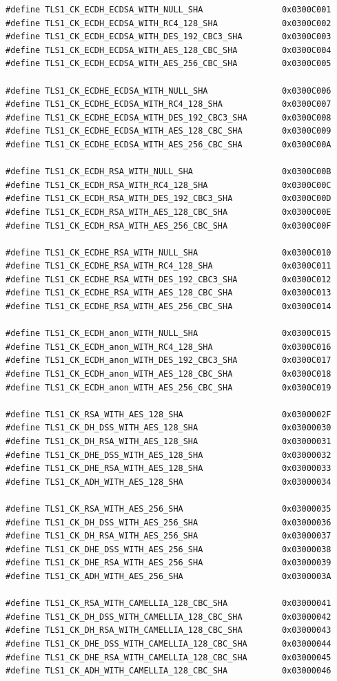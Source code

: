 \documentclass[a4paper,11pt,french]{article}
\begin{document}
\begin{verbatim}
#define TLS1_CK_ECDH_ECDSA_WITH_NULL_SHA                0x0300C001
#define TLS1_CK_ECDH_ECDSA_WITH_RC4_128_SHA             0x0300C002
#define TLS1_CK_ECDH_ECDSA_WITH_DES_192_CBC3_SHA        0x0300C003
#define TLS1_CK_ECDH_ECDSA_WITH_AES_128_CBC_SHA         0x0300C004
#define TLS1_CK_ECDH_ECDSA_WITH_AES_256_CBC_SHA         0x0300C005

#define TLS1_CK_ECDHE_ECDSA_WITH_NULL_SHA               0x0300C006
#define TLS1_CK_ECDHE_ECDSA_WITH_RC4_128_SHA            0x0300C007
#define TLS1_CK_ECDHE_ECDSA_WITH_DES_192_CBC3_SHA       0x0300C008
#define TLS1_CK_ECDHE_ECDSA_WITH_AES_128_CBC_SHA        0x0300C009
#define TLS1_CK_ECDHE_ECDSA_WITH_AES_256_CBC_SHA        0x0300C00A

#define TLS1_CK_ECDH_RSA_WITH_NULL_SHA                  0x0300C00B
#define TLS1_CK_ECDH_RSA_WITH_RC4_128_SHA               0x0300C00C
#define TLS1_CK_ECDH_RSA_WITH_DES_192_CBC3_SHA          0x0300C00D
#define TLS1_CK_ECDH_RSA_WITH_AES_128_CBC_SHA           0x0300C00E
#define TLS1_CK_ECDH_RSA_WITH_AES_256_CBC_SHA           0x0300C00F

#define TLS1_CK_ECDHE_RSA_WITH_NULL_SHA                 0x0300C010
#define TLS1_CK_ECDHE_RSA_WITH_RC4_128_SHA              0x0300C011
#define TLS1_CK_ECDHE_RSA_WITH_DES_192_CBC3_SHA         0x0300C012
#define TLS1_CK_ECDHE_RSA_WITH_AES_128_CBC_SHA          0x0300C013
#define TLS1_CK_ECDHE_RSA_WITH_AES_256_CBC_SHA          0x0300C014

#define TLS1_CK_ECDH_anon_WITH_NULL_SHA                 0x0300C015
#define TLS1_CK_ECDH_anon_WITH_RC4_128_SHA              0x0300C016
#define TLS1_CK_ECDH_anon_WITH_DES_192_CBC3_SHA         0x0300C017
#define TLS1_CK_ECDH_anon_WITH_AES_128_CBC_SHA          0x0300C018
#define TLS1_CK_ECDH_anon_WITH_AES_256_CBC_SHA          0x0300C019

#define TLS1_CK_RSA_WITH_AES_128_SHA                    0x0300002F
#define TLS1_CK_DH_DSS_WITH_AES_128_SHA                 0x03000030
#define TLS1_CK_DH_RSA_WITH_AES_128_SHA                 0x03000031
#define TLS1_CK_DHE_DSS_WITH_AES_128_SHA                0x03000032
#define TLS1_CK_DHE_RSA_WITH_AES_128_SHA                0x03000033
#define TLS1_CK_ADH_WITH_AES_128_SHA                    0x03000034

#define TLS1_CK_RSA_WITH_AES_256_SHA                    0x03000035
#define TLS1_CK_DH_DSS_WITH_AES_256_SHA                 0x03000036
#define TLS1_CK_DH_RSA_WITH_AES_256_SHA                 0x03000037
#define TLS1_CK_DHE_DSS_WITH_AES_256_SHA                0x03000038
#define TLS1_CK_DHE_RSA_WITH_AES_256_SHA                0x03000039
#define TLS1_CK_ADH_WITH_AES_256_SHA                    0x0300003A

#define TLS1_CK_RSA_WITH_CAMELLIA_128_CBC_SHA           0x03000041
#define TLS1_CK_DH_DSS_WITH_CAMELLIA_128_CBC_SHA        0x03000042
#define TLS1_CK_DH_RSA_WITH_CAMELLIA_128_CBC_SHA        0x03000043
#define TLS1_CK_DHE_DSS_WITH_CAMELLIA_128_CBC_SHA       0x03000044
#define TLS1_CK_DHE_RSA_WITH_CAMELLIA_128_CBC_SHA       0x03000045
#define TLS1_CK_ADH_WITH_CAMELLIA_128_CBC_SHA           0x03000046
\end{verbatim}
\end{document}
